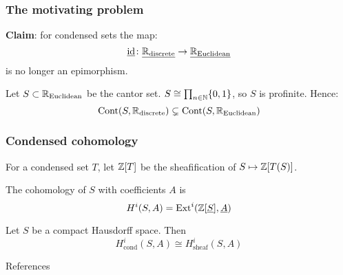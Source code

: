 \documentclass{beamer}
\DeclareMathOperator{\Cont}{Cont}
\DeclareMathOperator{\id}{id}
\begin{document}
\begin{frame}
    \frametitle{The motivating problem}

    \textbf{Claim}: for condensed sets the map:
    \begin{equation*}
        \underline{\id} \colon \underline{\bbR_{\text{discrete}}} \to \underline{\bbR_{\text{Euclidean}}}
    \end{equation*}
    is no longer an epimorphism.
    \pause

    \medskip
    Let $S \subset \mathbb{R}_{\text{Euclidean}}$ be the cantor set.
    $ S \cong \prod_{n\in \mathbb{N}}\{0,1\}$,
    so $S$ is profinite.
    Hence:
    \begin{equation*}
        \Cont(S, \bbR_{\text{discrete}}) \subsetneq \Cont(S, \bbR_{\text{Euclidean}})
    \end{equation*}
\end{frame}

\begin{frame}
    \frametitle{Condensed cohomology}

    For a condensed set $T$, let $\mathbb{Z}[T]$ be the sheafification
    of $S \mapsto \mathbb{Z}[T(S)]$.
    \begin{definition}
        The cohomology of $S$ with coefficients $A$ is
        \begin{equation*}
            H^i (S, A) = \operatorname{Ext}^i(\mathbb{Z}[\underline{S}], \underline{A})
        \end{equation*}
    \end{definition}

    \pause
    \begin{theorem}
        Let $S$ be a compact Hausdorff space. Then
        \begin{equation*}
            H^i_{\text{cond}}(S, A) \cong H^i_{\text{sheaf}}(S, A)
        \end{equation*}
    \end{theorem}
\end{frame}


\begin{frame}{References}
    \nocite{Sch2019LecturesCM}
    \nocite{Apa2021condensed}
    \nocite{stacks-project}
    \nocite{Sch2020MasterClass}
    
\end{frame}
\end{document}
